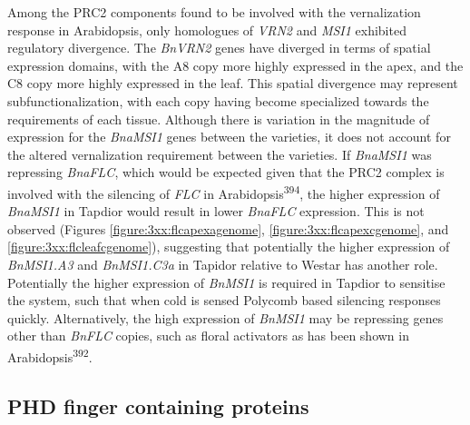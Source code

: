 \documentclass[12pt,]{book}
\begin{document}
Among the PRC2 components found to be involved with the vernalization
response in Arabidopsis, only homologues of \emph{VRN2} and \emph{MSI1}
exhibited regulatory divergence. The \emph{BnVRN2} genes have diverged
in terms of spatial expression domains, with the A8 copy more highly
expressed in the apex, and the C8 copy more highly expressed in the
leaf. This spatial divergence may represent subfunctionalization, with
each copy having become specialized towards the requirements of each
tissue. Although there is variation in the magnitude of expression for
the \emph{BnaMSI1} genes between the varieties, it does not account for
the altered vernalization requirement between the varieties. If
\emph{BnaMSI1} was repressing \emph{BnaFLC}, which would be expected
given that the PRC2 complex is involved with the silencing of \emph{FLC}
in Arabidopsis\textsuperscript{394}, the higher expression of
\emph{BnaMSI1} in Tapdior would result in lower \emph{BnaFLC}
expression. This is not observed (Figures
\ref{figure:3xx:flcapexagenome}, \ref{figure:3xx:flcapexcgenome}, and
\ref{figure:3xx:flcleafcgenome}), suggesting that potentially the higher
expression of \emph{BnMSI1.A3} and \emph{BnMSI1.C3a} in Tapidor relative
to Westar has another role. Potentially the higher expression of
\emph{BnMSI1} is required in Tapdior to sensitise the system, such that
when cold is sensed Polycomb based silencing responses quickly.
Alternatively, the high expression of \emph{BnMSI1} may be repressing
genes other than \emph{BnFLC} copies, such as floral activators as has
been shown in Arabidopsis\textsuperscript{392}.

\subsection{PHD finger containing proteins}\label{section:winter:phd}
\end{document}
